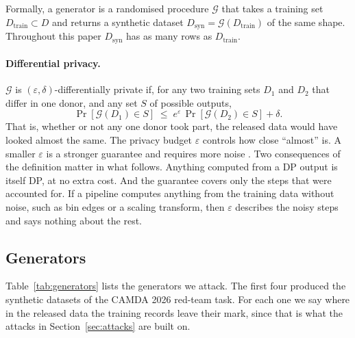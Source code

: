 \documentclass[webpdf,contemporary,large]{oup-authoring-template}
\newcommand{\Dtrain}{D_{\mathrm{train}}}
\newcommand{\Dsyn}{D_{\mathrm{syn}}}
\begin{document}
Formally, a generator is a randomised procedure $\mathcal{G}$ that takes a training set $\Dtrain \subset D$ and returns a synthetic dataset $\Dsyn = \mathcal{G}(\Dtrain)$ of the same shape. Throughout this paper $\Dsyn$ has as many rows as $\Dtrain$.

\paragraph{Differential privacy.}
$\mathcal{G}$ is $(\varepsilon,\delta)$-differentially private if, for any two training sets $D_1$ and $D_2$ that differ in one donor, and any set $S$ of possible outputs,
\begin{equation}
  \Pr[\mathcal{G}(D_1) \in S] \;\le\; e^{\varepsilon}\, \Pr[\mathcal{G}(D_2) \in S] + \delta .
  \label{eq:dp}
\end{equation}
That is, whether or not any one donor took part, the released data would have looked almost the same. The privacy budget $\varepsilon$ controls how close ``almost'' is. A smaller $\varepsilon$ is a stronger guarantee and requires more noise \citep{dwork2014algorithmic}. Two consequences of the definition matter in what follows. Anything computed from a DP output is itself DP, at no extra cost. And the guarantee covers only the steps that were accounted for. If a pipeline computes anything from the training data without noise, such as bin edges or a scaling transform, then $\varepsilon$ describes the noisy steps and says nothing about the rest.

\subsection{Generators}
\label{sec:generators}

Table~\ref{tab:generators} lists the generators we attack. The first four produced the synthetic datasets of the CAMDA 2026 red-team task. For each one we say where in the released data the training records leave their mark, since that is what the attacks in Section~\ref{sec:attacks} are built on.
\end{document}
